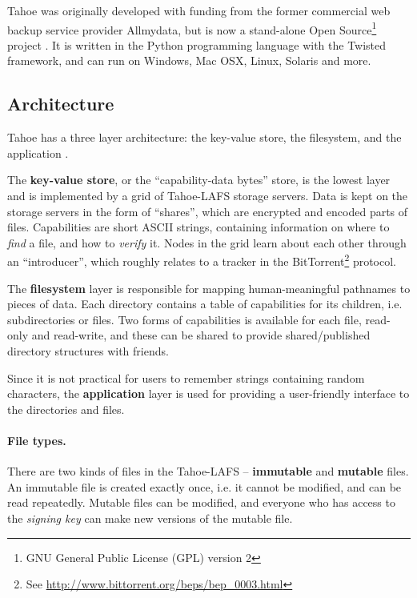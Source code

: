 \documentclass[english,12pt,a4paper]{book}
\begin{document}
Tahoe was originally developed with funding from the former commercial web
backup service provider Allmydata, but is now a stand-alone Open
Source\footnote{GNU General Public License (GPL) version 2} project
\cite{t_ars}.  It is written in the Python programming language with the Twisted
framework, and can run on Windows, Mac OSX, Linux, Solaris and more.

\subsection{Architecture}

Tahoe has a three layer architecture: the key-value store, the filesystem, and
the application \cite{t_tahoe}.

The \textbf{key-value store}, or the ``capability-data bytes'' store, is the
lowest layer and is implemented by a grid of Tahoe-LAFS storage servers. Data is
kept on the storage servers in the form of ``shares'', which are encrypted and
encoded parts of files. Capabilities are short ASCII strings, containing
information on where to \emph{find} a file, and how to \emph{verify} it.
Nodes in the grid learn about each other through an ``introducer'', which
roughly relates to a tracker in the BitTorrent\footnote{See
\url{http://www.bittorrent.org/beps/bep\_0003.html}} protocol.

The \textbf{filesystem} layer is responsible for mapping human-meaningful
pathnames to pieces of data. Each directory contains a table of capabilities
for its children, i.e. subdirectories or files. Two forms of capabilities is
available for each file, read-only and read-write, and these can be shared to
provide shared/published directory structures with friends.

Since it is not practical for users to remember strings containing random
characters, the \textbf{application} layer is used for providing a user-friendly
interface to the directories and files.

\paragraph{File types.}

There are two kinds of files in the Tahoe-\ac{LAFS} -- \textbf{immutable} and
\textbf{mutable} files. An immutable file is created exactly once, i.e. it
cannot be modified, and can be read repeatedly. Mutable files can be modified,
and everyone who has access to the \emph{signing key} can make new versions of
the mutable file.
\end{document}
